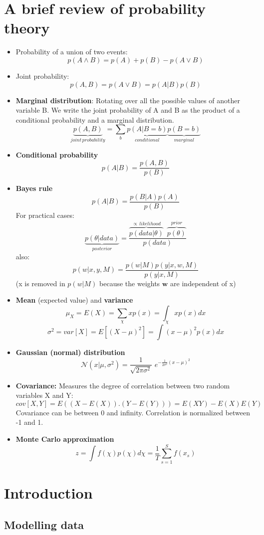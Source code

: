 \documentclass[a4paper,11pt]{article}
\begin{document}
	\section{A brief review of probability theory}
	\begin{itemize}
		\item Probability of a union of two events:
		\[
		p(A \wedge B) = p(A) + p(B) - p(A \vee B)
		\]
		\item Joint probability:
		\[
		p(A,B) = p(A \vee B) = p(A | B)p(B)
		\]
		\item \textbf{Marginal distribution}: Rotating over all the possible values of another variable B. We write the joint probability of A and B as the product of a conditional probability and a marginal distribution.
		\[
		\underbrace{p(A,B)}_{joint\, probability} = \sum_{b} \underbrace{p(A | B=b)}_{conditional}\underbrace{p(B=b)}_{marginal}
		\]
		\item \textbf{Conditional probability}
		\[
		p(A|B) = \frac{p(A,B)}{p(B)}
		\]
		\item \textbf{Bayes rule}
		\[
		p(A|B) = \frac{p(B|A)p(A)}{p(B)}
		\]
		For practical cases:
		\[
		\underbrace{p(\theta|data)}_{posterior} = \frac{\overbrace{p(data|\theta)}^{\propto\,likelihood}\,\,\,\overbrace{p(\theta)}^{prior}}{p(data)}
		\]
		also:
		\[
		p(w|x,y,M) = \frac{p(w|M) p(y|x,w,M)}{p(y|x,M)}
		\]
		(x is removed in $p(w|M)$ because the weights $\mathbf{w}$ are independent of x)
		\item \textbf{Mean} (expected value) and \textbf{variance}
		\[
		\mu_X = E(X)=\sum_{\chi} x p(x) = \int_{\chi} x p(x)dx
		\]
		\[
		\sigma^2= var[X] = E[(X-\mu)^2]=\int (x-\mu)^2 p(x)dx
		\]
		\item \textbf{Gaussian (normal) distribution}
		\[
		\mathcal{N}(x|\mu, \sigma^2) = \frac{1}{\sqrt{2\pi\sigma^2}}\,\, e^{-\frac{1}{2\sigma^2} (x-\mu)^2}
		\]
		\item \textbf{Covariance:} Measures the degree of correlation between two random variables X and Y:
		\[
		cov[X,Y] = E((X-E(X)).(Y-E(Y))) = E(XY)-E(X)E(Y)
		\]
		Covariance can be between 0 and infinity. Correlation is normalized between -1 and 1.
		\item \textbf{Monte Carlo approximation}
		\[
		z = \int f(\chi)p(\chi)d\chi = \frac{1}{T} \sum_{s=1}^{S} f(x_s)	
		\]
	\end{itemize}
	\section{Introduction}
	\subsection{Modelling data}
\end{document}
